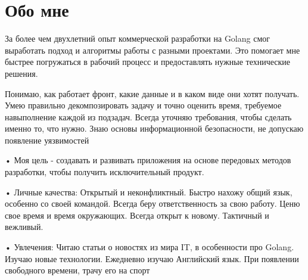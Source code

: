 \documentclass[letterpaper,11pt]{article}
\begin{document}
\section{Обо мне}
\begin{itemize}[leftmargin=0.15in, label={}]
\small{
\item{За более чем двухлетний опыт коммерческой разработки на Golang смог выработать подход и алгоритмы работы с разными проектами. Это помогает мне быстрее погружаться в рабочий процесс и предоставлять нужные технические решения.} \
\item{Понимаю, как работает фронт, какие данные и в каком виде они хотят получать. Умею правильно декомпозировать задачу и точно оценить время, требуемое навыполнение каждой из подзадач. Всегда уточняю требования, чтобы сделать именно то, что нужно. Знаю основы информационной безопасности, не допускаю появление уязвимостей} \
\item{• Моя цель - создавать и развивать приложения на основе передовых методов разработки, чтобы получить исключительный продукт.} \
\item{• Личные качества: Открытый и неконфликтный. Быстро нахожу общий язык, особенно со своей командой. Всегда беру ответственность за свою работу. Ценю свое время и время окружающих. Всегда открыт к новому. Тактичный и вежливый.} \
\item{• Увлечения: Читаю статьи о новостях из мира IT, в особенности про Golang. Изучаю новые технологии. Ежедневно изучаю Английский язык. При появлении свободного времени, трачу его на спорт} \
}
\end{itemize}

\end{document}
